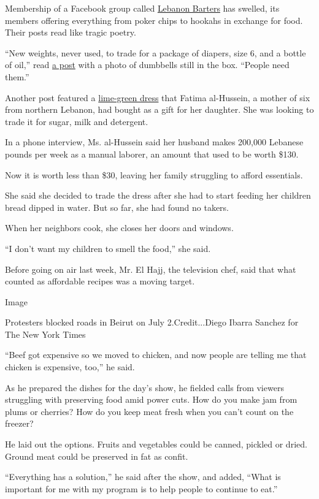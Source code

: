 Membership of a Facebook group called
\href{https://www.facebook.com/groups/697518051074366/permalink/722296395263198/}{Lebanon
Barters} has swelled, its members offering everything from poker chips
to hookahs in exchange for food. Their posts read like tragic poetry.

``New weights, never used, to trade for a package of diapers, size 6,
and a bottle of oil,'' read
\href{https://www.facebook.com/groups/697518051074366/permalink/722718038554367/}{a
post} with a photo of dumbbells still in the box. ``People need them.''

Another post featured a
\href{https://www.facebook.com/groups/697518051074366/permalink/722296395263198/}{lime-green
dress} that Fatima al-Hussein, a mother of six from northern Lebanon,
had bought as a gift for her daughter. She was looking to trade it for
sugar, milk and detergent.

In a phone interview, Ms. al-Hussein said her husband makes 200,000
Lebanese pounds per week as a manual laborer, an amount that used to be
worth \$130.

Now it is worth less than \$30, leaving her family struggling to afford
essentials.

She said she decided to trade the dress after she had to start feeding
her children bread dipped in water. But so far, she had found no takers.

When her neighbors cook, she closes her doors and windows.

``I don't want my children to smell the food,'' she said.

Before going on air last week, Mr. El Hajj, the television chef, said
that what counted as affordable recipes was a moving target.

Image

Protesters blocked roads in Beirut on July 2.Credit...Diego Ibarra
Sanchez for The New York Times

``Beef got expensive so we moved to chicken, and now people are telling
me that chicken is expensive, too,'' he said.

As he prepared the dishes for the day's show, he fielded calls from
viewers struggling with preserving food amid power cuts. How do you make
jam from plums or cherries? How do you keep meat fresh when you can't
count on the freezer?

He laid out the options. Fruits and vegetables could be canned, pickled
or dried. Ground meat could be preserved in fat as confit.

``Everything has a solution,'' he said after the show, and added, ``What
is important for me with my program is to help people to continue to
eat.''

